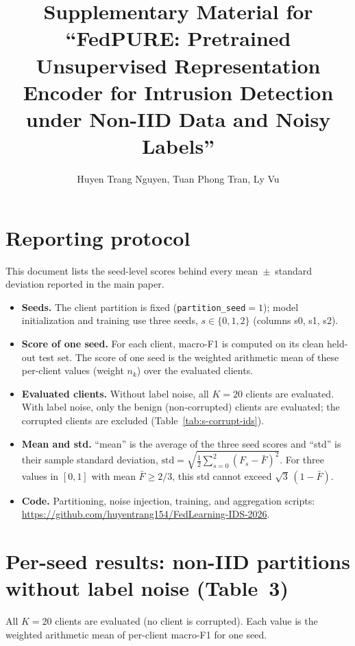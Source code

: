 \documentclass[11pt]{article}
\title{Supplementary Material for\\
``FedPURE: Pretrained Unsupervised Representation Encoder for Intrusion Detection under Non-IID Data and Noisy Labels''}
\author{Huyen Trang Nguyen, Tuan Phong Tran, Ly Vu}
\date{}
\begin{document}
\maketitle

\section{Reporting protocol}
This document lists the seed-level scores behind every mean~$\pm$~standard deviation reported in the main paper.
\begin{itemize}
  \item \textbf{Seeds.} The client partition is fixed (\texttt{partition\_seed}$=1$); model initialization and training use three seeds, $s\in\{0,1,2\}$ (columns s0, s1, s2).
  \item \textbf{Score of one seed.} For each client, macro-F1 is computed on its clean held-out test set. The score of one seed is the weighted arithmetic mean of these per-client values (weight $n_k$) over the evaluated clients.
  \item \textbf{Evaluated clients.} Without label noise, all $K=20$ clients are evaluated. With label noise, only the benign (non-corrupted) clients are evaluated; the corrupted clients are excluded (Table~\ref{tab:s-corrupt-ids}).
  \item \textbf{Mean and std.} ``mean'' is the average of the three seed scores and ``std'' is their sample standard deviation,
  $\mathrm{std}=\sqrt{\tfrac{1}{2}\sum_{s=0}^{2}(F_s-\bar F)^2}$.
  For three values in $[0,1]$ with mean $\bar F\ge 2/3$, this std cannot exceed $\sqrt{3}\,(1-\bar F)$.
  \item \textbf{Code.} Partitioning, noise injection, training, and aggregation scripts: \url{https://github.com/huyentrang154/FedLearning-IDS-2026}.
\end{itemize}

\section{Per-seed results: non-IID partitions without label noise (Table~3)}

All $K=20$ clients are evaluated (no client is corrupted). Each value is the weighted arithmetic mean of per-client macro-F1 for one seed.
\end{document}

